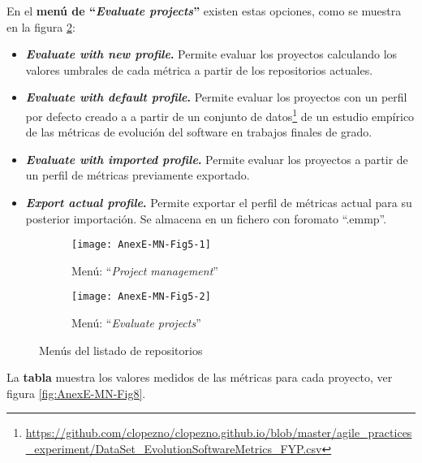 En el \textbf{menú de ``\textit{Evaluate projects}''} existen estas opciones, como se muestra en la figura \ref{fig:AnexE-MN-Fig5-2}:
\begin{itemize}
	\item \textbf{\textit{Evaluate with new profile}.} Permite evaluar los proyectos calculando los valores umbrales de cada métrica a partir de los repositorios actuales.
	
	\item \textbf{\textit{Evaluate with default profile}.} Permite evaluar los proyectos con un perfil por defecto creado a a partir de un conjunto de datos\footnote{\url{https://github.com/clopezno/clopezno.github.io/blob/master/agile_practices_experiment/DataSet_EvolutionSoftwareMetrics_FYP.csv}} de un estudio empírico de las métricas de evolución del software en trabajos finales de grado\cite{lopez_nozal_measuring_2019}.
	
	\item \textbf{\textit{Evaluate with imported profile}.} Permite evaluar los proyectos a partir de un perfil de métricas previamente exportado.
	
	\item \textbf{\textit{Export actual profile}.} Permite exportar el perfil de métricas actual para su posterior importación. Se almacena en un fichero con foromato ``.emmp''.
\end{itemize}

\begin{figure}[!h]
	\centering
	\begin{subfigure}{.45\textwidth}
		\centering
		\texttt{[image: AnexE-MN-Fig5-1]}
		\caption{Menú: ``\textit{Project management}''}
		\label{fig:AnexE-MN-Fig5-1}
	\end{subfigure}\hfill
	\begin{subfigure}{.45\textwidth}
		\centering
		\texttt{[image: AnexE-MN-Fig5-2]}
		\caption{Menú: ``\textit{Evaluate projects}''}
		\label{fig:AnexE-MN-Fig5-2}
	\end{subfigure}
	\caption{Menús del listado de repositorios}
	\label{fig:AnexE-MN-Fig5}
\end{figure}

La \textbf{tabla} muestra los valores medidos de las métricas para cada proyecto, ver figura \ref{fig:AnexE-MN-Fig8}.


